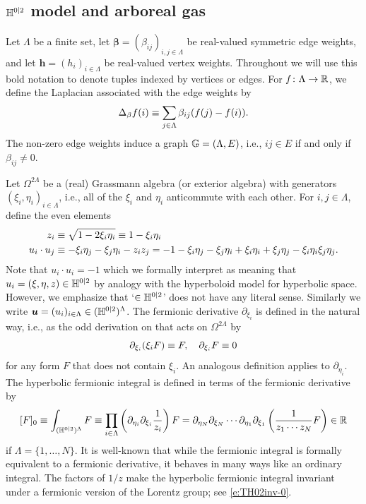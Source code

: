 \documentclass[11pt]{amsart}
\numberwithin{equation}{section}
\numberwithin{theorem}{section}
\newcommand{\V}[1]{\boldsymbol{#1}}
\begin{document}
\subsection{$\mathbb{H}^{0|2}$ model and arboreal gas}
\label{sec:repr-h02}

Let $\Lambda$ be a finite set, let
$\V{\beta} = (\beta_{ij})_{i,j\in\Lambda}$ be real-valued
symmetric edge weights, and let $\V{h} = (h_i)_{i\in\Lambda}$ be
real-valued vertex weights.
Throughout we will use this bold notation to
denote tuples indexed by vertices or edges.
For $f\colon \Lambda \to \mathbb{R}$,
we define the Laplacian associated with the edge weights by
\begin{equation}
  \Delta_{\beta}f(i) \equiv \sum_{j\in\Lambda}\beta_{ij}(f(j)-f(i)).
\end{equation}
The non-zero edge weights induce a graph ${\mathbb G} = (\Lambda, E)$,
i.e., $ij\in E$ if and only if $\beta_{ij}\neq 0$.

Let $\Omega^{2\Lambda}$ be a (real) Grassmann algebra (or exterior
algebra) with generators $(\xi_i,\eta_i)_{i\in\Lambda}$, i.e., all of
the $\xi_i$ and $\eta_i$ anticommute with each other.  For
$i,j\in\Lambda$, define the even elements
\begin{align}
  \label{eq:zH02def}
  z_i &\equiv \sqrt{1- 2\xi_i\eta_i} \equiv 1-\xi_i\eta_i
  \\
  \label{eq:H02IP}
  u_i \cdot u_j &\equiv -\xi_i\eta_j - \xi_j\eta_i - z_iz_j
                  =
                  -1 -\xi_i\eta_j - \xi_j\eta_i + \xi_i\eta_i + \xi_j\eta_j - \xi_i\eta_i\xi_j\eta_j.
\end{align}
Note that $u_i \cdot u_i = -1$ which we formally interpret as meaning
that $u_i=(\xi,\eta,z) \in \mathbb{H}^{0|2}$ by analogy with the hyperboloid
model for hyperbolic space.  However, we emphasize that
`$\in \mathbb{H}^{0|2}$' does not have any literal sense. Similarly we
write $\V{u} = (u_{i})_{i\in\Lambda}\in (\HH^{0|2})^{\Lambda}$.
The fermionic derivative $\partial_{\xi_i}$ is defined in the natural
way, i.e., as the odd derivation on that acts on $\Omega^{2\Lambda}$ by
\begin{equation}
  \partial_{\xi_i} (\xi_i F) \equiv F, \quad \partial_{\xi_i}F \equiv 0
\end{equation}
for any form $F$ that does not contain $\xi_{i}$. An analogous
definition applies to $\partial_{\eta_i}$.  The hyperbolic fermionic
integral is defined in terms of the fermionic derivative by
\begin{equation} 
\label{e:H02int}
  [F]_0
  \equiv \int_{(\mathbb{H}^{0|2})^\Lambda} F
  \equiv \prod_{i \in \Lambda} \left({\partial_{\eta_i} \partial_{\xi_i} \frac{1}{z_i}}\right) F
  = \partial_{\eta_N}\partial_{\xi_N} \cdots \partial_{\eta_1}\partial_{\xi_1} \left({\frac{1}{z_1\cdots z_N} F}\right)
  \in \mathbb{R}
\end{equation}
if $\Lambda=\{1,\dots,N\}$. It is well-known that while the fermionic integral 
is formally equivalent to a fermionic derivative, it behaves in many
ways like an ordinary integral. The factors of $1/z$ make the
hyperbolic fermionic integral invariant under a fermionic
version of the Lorentz group; see \eqref{e:TH02inv-0}.
\end{document}
